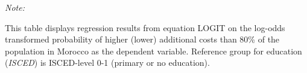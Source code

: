 \begin{table}[htbp!]
\begin{adjustbox}{width = 1\textwidth, max height = 0.95\textheight, center}
\begin{threeparttable}[b]
         \begin{tablenotes}\item \medskip \textit{Note:}
            \item This table displays regression results from equation LOGIT on the log-odds transformed probability of higher (lower) additional costs than 80\% of the population in Morocco as the dependent variable. Reference group for education (\textit{ISCED}) is ISCED-level 0-1 (primary or no education).
         \end{tablenotes}
      \end{threeparttable}
   \end{adjustbox}
\end{table}


